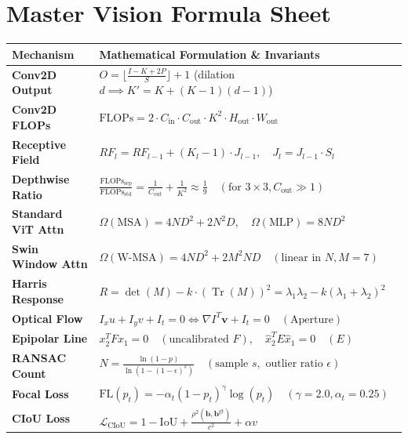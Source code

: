 \section{Master Vision Formula Sheet}\label{sec:formulas}

\noindent\begin{tabularx}{\linewidth}{@{}p{23mm} X@{}}
\toprule
\textbf{Mechanism} & \textbf{Mathematical Formulation \& Invariants}\\
\midrule
\textbf{Conv2D Output} & $O = \lfloor \frac{I - K + 2P}{S} \rfloor + 1$ \quad (dilation $d \implies K' = K + (K-1)(d-1)$)\\
\textbf{Conv2D FLOPs} & $\text{FLOPs} = 2 \cdot C_{\text{in}} \cdot C_{\text{out}} \cdot K^2 \cdot H_{\text{out}} \cdot W_{\text{out}}$\\
\textbf{Receptive Field} & $RF_l = RF_{l-1} + (K_l - 1) \cdot J_{l-1}, \quad J_l = J_{l-1} \cdot S_l$\\
\textbf{Depthwise Ratio} & $\frac{\text{FLOPs}_{\text{sep}}}{\text{FLOPs}_{\text{std}}} = \frac{1}{C_{\text{out}}} + \frac{1}{K^2} \approx \frac{1}{9} \quad (\text{for } 3\times 3, C_{\text{out}} \gg 1)$\\
\textbf{Standard ViT Attn} & $\Omega(\text{MSA}) = 4ND^2 + 2N^2D, \quad \Omega(\text{MLP}) = 8ND^2$\\
\textbf{Swin Window Attn} & $\Omega(\text{W-MSA}) = 4ND^2 + 2M^2ND \quad (\text{linear in } N, M=7)$\\
\textbf{Harris Response} & $R = \det(M) - k \cdot (\operatorname{Tr}(M))^2 = \lambda_1 \lambda_2 - k(\lambda_1 + \lambda_2)^2$\\
\textbf{Optical Flow} & $I_x u + I_y v + I_t = 0 \iff \nabla I^T \mathbf{v} + I_t = 0 \quad (\text{Aperture})$\\
\textbf{Epipolar Line} & $x_2^T F x_1 = 0 \quad (\text{uncalibrated } F), \quad \hat{x}_2^T E \hat{x}_1 = 0 \quad (E)$\\
\textbf{RANSAC Count} & $N = \frac{\ln(1 - p)}{\ln(1 - (1 - \epsilon)^s)} \quad (\text{sample } s, \text{ outlier ratio } \epsilon)$\\
\textbf{Focal Loss} & $\text{FL}(p_t) = -\alpha_t (1 - p_t)^\gamma \log(p_t) \quad (\gamma=2.0, \alpha_t=0.25)$\\
\textbf{CIoU Loss} & $\mathcal{L}_{\text{CIoU}} = 1 - \text{IoU} + \frac{\rho^2(\mathbf{b}, \mathbf{b}^{\text{gt}})}{c^2} + \alpha v$\\[1pt]

\end{tabularx}
